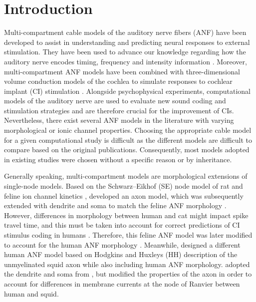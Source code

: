 \documentclass[utf8]{frontiersSCNS} %
\begin{document}
\section{Introduction}
\label{sec:introduction}
Multi-compartment cable models of the auditory nerve fibers (ANF) have been developed to assist in understanding and predicting neural responses to external stimulation. They have been used to advance our knowledge regarding how the auditory nerve encodes timing, frequency and intensity information \citep{Imennov2009}. Moreover, multi-compartment ANF models have %
been combined with three-dimensional volume conduction models of the cochlea to simulate responses to cochlear implant (CI) stimulation \citep{Kalkman2015,Malherbe2016,Nogueira2018}. Alongside psychophysical experiments, computational models of the auditory nerve are used to evaluate new sound coding and stimulation strategies and are therefore crucial for the improvement of CIs. Nevertheless, there exist several ANF models in the literature with varying  morphological or ionic channel properties. Choosing the appropriate cable model for a given computational study is difficult as the different models are difficult to compare based on the original publications. Consequently, most models adopted in existing studies were chosen without a specific reason or by inheritance.

Generally speaking, multi-compartment models are morphological extensions of single-node models. Based on the Schwarz–Eikhof (SE) node model of rat and feline ion channel kinetics \citep{Schwarz1987}, \cite{Frijns1994} developed an axon model, which was subsequently extended with dendrite and soma to match the feline ANF morphology \citep{Frijns1995}. However, differences in morphology between human and cat might impact spike travel time, and this must be taken into account for correct predictions of CI stimulus coding in humans \citep{Rattay2001,OBrien2016}. Therefore, this feline ANF model was later modified to account for the human ANF morphology \citep{Briaire2005}. Meanwhile, \cite{Rattay2001} designed a different human ANF model based on Hodgkins and Huxleys (HH) description of the unmyelinated squid axon \citep{Hodgkin1952} while also including human ANF morphology. \cite{Smit2008} adopted the dendrite and soma from \cite{Rattay2001}, but modified the properties of the axon in order to account for differences in membrane currents at the node of Ranvier between human \citep{Schwarz1995} and squid.
\end{document}
